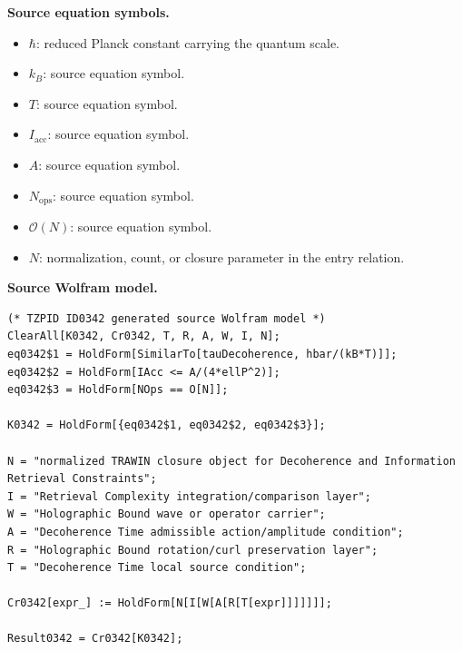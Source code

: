 \begin{minipage}[t]{0.49\linewidth}
\begingroup
\small
\raggedright
\textbf{Source equation symbols.}\par
\begin{itemize}[leftmargin=1.35em,itemsep=1pt,topsep=1pt,parsep=0pt]
    \item $\hbar$: reduced Planck constant carrying the quantum scale.
    \item $k_B$: source equation symbol.
    \item $T$: source equation symbol.
    \item $I_{\mathrm{acc}}$: source equation symbol.
    \item $A$: source equation symbol.
    \item $N_{\mathrm{ops}}$: source equation symbol.
    \item $\mathcal{O}(N)$: source equation symbol.
    \item $N$: normalization, count, or closure parameter in the entry relation.
\end{itemize}
\endgroup
\end{minipage}\hfill
\begin{minipage}[t]{0.47\linewidth}
\begingroup
\scriptsize
\raggedright
\textbf{Source Wolfram model.}\par
\begin{Verbatim}[fontsize=\tiny,breaklines=true,breakanywhere=true]
(* TZPID ID0342 generated source Wolfram model *)
ClearAll[K0342, Cr0342, T, R, A, W, I, N];
eq0342$1 = HoldForm[SimilarTo[tauDecoherence, hbar/(kB*T)]];
eq0342$2 = HoldForm[IAcc <= A/(4*ellP^2)];
eq0342$3 = HoldForm[NOps == O[N]];

K0342 = HoldForm[{eq0342$1, eq0342$2, eq0342$3}];

N = "normalized TRAWIN closure object for Decoherence and Information Retrieval Constraints";
I = "Retrieval Complexity integration/comparison layer";
W = "Holographic Bound wave or operator carrier";
A = "Decoherence Time admissible action/amplitude condition";
R = "Holographic Bound rotation/curl preservation layer";
T = "Decoherence Time local source condition";

Cr0342[expr_] := HoldForm[N[I[W[A[R[T[expr]]]]]]];

Result0342 = Cr0342[K0342];
\end{Verbatim}
\endgroup
\end{minipage}

